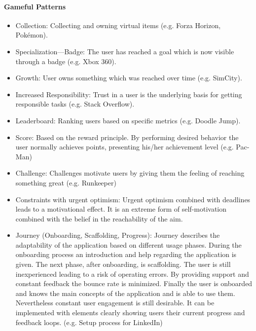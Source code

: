 \paragraph*{Gameful Patterns}
\label{GamefulPatterns}
\begin{itemize}
	\item Collection: Collecting and owning virtual items (e.g. Forza Horizon, Pokémon). \cite[p. 4, 35]{lewisIrresistibleAppsMotivational2014}
	\item Specialization—Badge: The user has reached a goal which is now visible through a badge (e.g. Xbox 360). \cite[p. 4, 37]{lewisIrresistibleAppsMotivational2014}
	\item Growth: User owns something which was reached over time (e.g. SimCity). \cite[p. 4, 40]{lewisIrresistibleAppsMotivational2014}
	\item Increased Responsibility: Trust in a user is the underlying basis for getting responsible tasks (e.g. Stack Overflow). \cite[p. 4, 41]{lewisIrresistibleAppsMotivational2014}
	\item Leaderboard: Ranking users based on specific metrics (e.g. Doodle Jump). \cite[p. 4, 44]{lewisIrresistibleAppsMotivational2014}
	\item Score: Based on the reward principle. By performing desired behavior the user normally achieves points, presenting his/her achievement level (e.g. Pac-Man) \cite[p. 4, 46]{lewisIrresistibleAppsMotivational2014}
	\item Challenge: Challenges motivate users by giving them the feeling of reaching something great (e.g. Runkeeper) \cite[p. 77, 78]{kumarGamificationWorkDesigning2013}
	\item Constraints with urgent optimism: Urgent optimism combined with deadlines leads to a motivational effect. It is an extreme form of self-motivation combined with the belief in the reachability of the aim. \cite[p. 78]{kumarGamificationWorkDesigning2013}
	\item Journey (Onboarding, Scaffolding, Progress): Journey describes the adaptability of the application based on different usage phases. During the onboarding process an introduction and help regarding the application is given. The next phase, after onboarding, is scaffolding. The user is still inexperienced leading to a risk of operating errors. By providing support and constant feedback the bounce rate is minimized. Finally the user is onboarded and knows the main concepts of the application and is able to use them. Nevertheless constant user engagement is still desirable. It can be implemented with elements clearly showing users their current progress and feedback loops. (e.g. Setup process for LinkedIn) \cite[p. 80, 81, 82]{kumarGamificationWorkDesigning2013}
\end{itemize}

